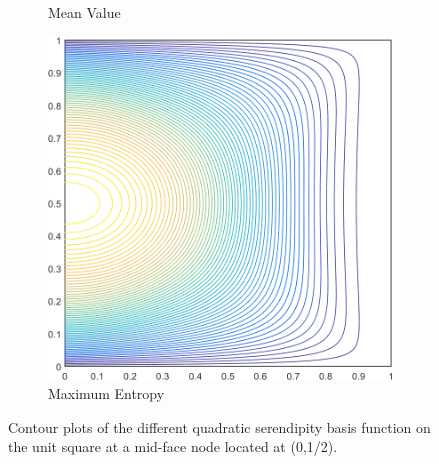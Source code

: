 \begin{figure}
\begin{subfigure}[b]{0.39\textwidth}
		\caption{Mean Value}
	\end{subfigure}
	\hspace{1.5cm}
	\begin{subfigure}[b]{0.39\textwidth}
		\centering
		\includegraphics[width=\textwidth]{figures/sec_BF/square_MAXENT2_contour_b8.png}
		\caption{Maximum Entropy}
	\end{subfigure}
\caption[Contour plots of the quadratic basis functions on the unit square.]{Contour plots of the different quadratic serendipity basis function on the unit square at a mid-face node located at (0,1/2).}
\label{fig::2D_Quadratic_Summary_unit_square_basis_functions_BF8}
\end{figure}


